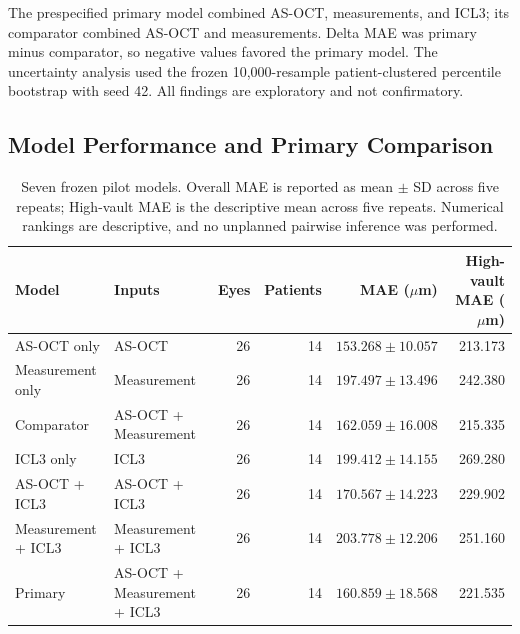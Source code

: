 The prespecified primary model combined AS-OCT, measurements, and ICL3; its comparator combined AS-OCT and measurements. Delta MAE was primary minus comparator, so negative values favored the primary model. The uncertainty analysis used the frozen 10,000-resample patient-clustered percentile bootstrap with seed 42. All findings are exploratory and not confirmatory.

\subsection{Model Performance and Primary Comparison}

\FloatBarrier

\begin{table}[H]
\centering
\caption{Seven frozen pilot models. Overall MAE is reported as mean $\pm$ SD across five repeats; High-vault MAE is the descriptive mean across five repeats. Numerical rankings are descriptive, and no unplanned pairwise inference was performed.}
\label{tab:supp_pilot_models}
\footnotesize
\setlength{\tabcolsep}{4pt}
\begin{tabular}{llrrrr}
\toprule
Model & Inputs & Eyes & Patients & MAE ($\mu$m) & High-vault MAE ($\mu$m) \\
\midrule
AS-OCT only & AS-OCT & 26 & 14 & $153.268 \pm 10.057$ & 213.173 \\
Measurement only & Measurement & 26 & 14 & $197.497 \pm 13.496$ & 242.380 \\
Comparator & AS-OCT + Measurement & 26 & 14 & $162.059 \pm 16.008$ & 215.335 \\
ICL3 only & ICL3 & 26 & 14 & $199.412 \pm 14.155$ & 269.280 \\
AS-OCT + ICL3 & AS-OCT + ICL3 & 26 & 14 & $170.567 \pm 14.223$ & 229.902 \\
Measurement + ICL3 & Measurement + ICL3 & 26 & 14 & $203.778 \pm 12.206$ & 251.160 \\
Primary & AS-OCT + Measurement + ICL3 & 26 & 14 & $160.859 \pm 18.568$ & 221.535 \\
\bottomrule
\end{tabular}
\end{table}

\begin{table}[H]
\centering
\caption{Prespecified primary paired comparison. The bootstrap interval crosses zero and is not an equivalence test.}
\label{tab:supp_pilot_primary}
\footnotesize
\setlength{\tabcolsep}{5pt}
\end{table}

